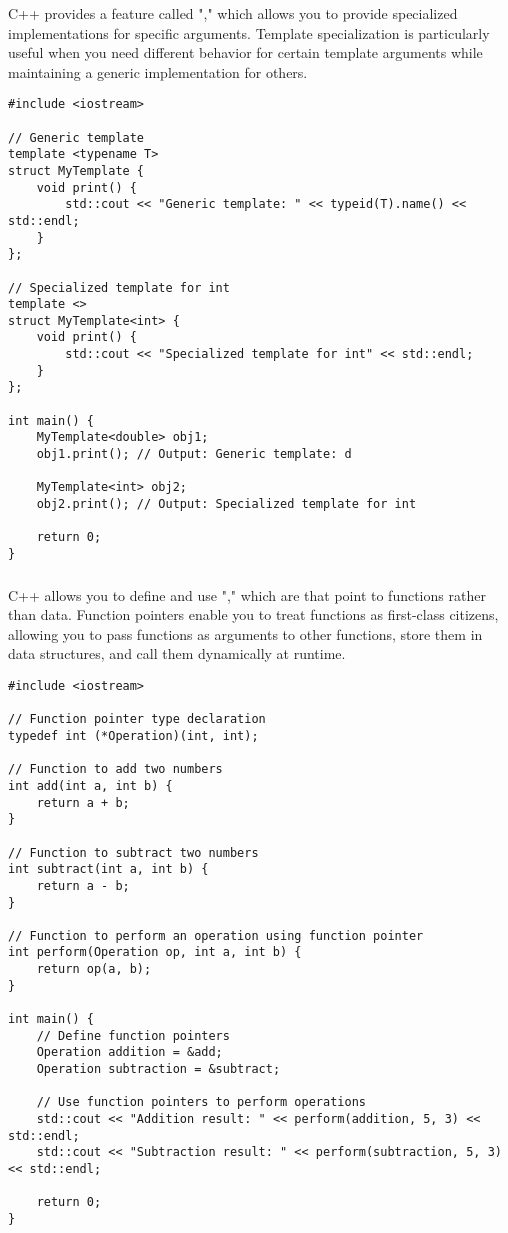 \subsubsection{}

C++ provides a feature called "," which allows you to provide specialized implementations for specific  arguments. Template specialization is particularly useful when you need different behavior for certain template arguments while maintaining a generic implementation for others.
\begin{lstlisting}
#include <iostream>

// Generic template
template <typename T>
struct MyTemplate {
    void print() {
        std::cout << "Generic template: " << typeid(T).name() << std::endl;
    }
};

// Specialized template for int
template <>
struct MyTemplate<int> {
    void print() {
        std::cout << "Specialized template for int" << std::endl;
    }
};

int main() {
    MyTemplate<double> obj1;
    obj1.print(); // Output: Generic template: d

    MyTemplate<int> obj2;
    obj2.print(); // Output: Specialized template for int

    return 0;
}
\end{lstlisting}






\subsubsection{}

C++ allows you to define and use "," which are  that point to functions rather than data. Function pointers enable you to treat functions as first-class citizens, allowing you to pass functions as arguments to other functions, store them in data structures, and call them dynamically at runtime.
\begin{lstlisting}
#include <iostream>

// Function pointer type declaration
typedef int (*Operation)(int, int);

// Function to add two numbers
int add(int a, int b) {
    return a + b;
}

// Function to subtract two numbers
int subtract(int a, int b) {
    return a - b;
}

// Function to perform an operation using function pointer
int perform(Operation op, int a, int b) {
    return op(a, b);
}

int main() {
    // Define function pointers
    Operation addition = &add;
    Operation subtraction = &subtract;

    // Use function pointers to perform operations
    std::cout << "Addition result: " << perform(addition, 5, 3) << std::endl;
    std::cout << "Subtraction result: " << perform(subtraction, 5, 3) << std::endl;

    return 0;
}
\end{lstlisting}

